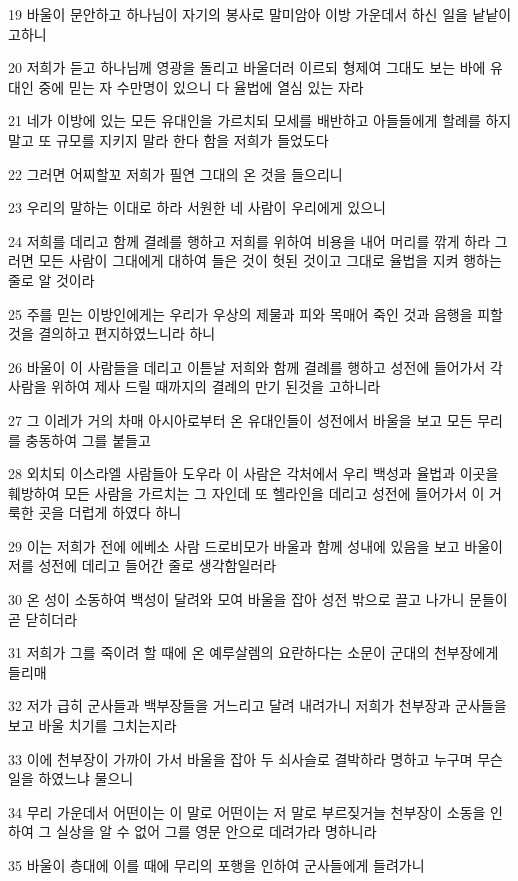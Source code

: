 \par 19 바울이 문안하고 하나님이 자기의 봉사로 말미암아 이방 가운데서 하신 일을 낱낱이 고하니
\par 20 저희가 듣고 하나님께 영광을 돌리고 바울더러 이르되 형제여 그대도 보는 바에 유대인 중에 믿는 자 수만명이 있으니 다 율법에 열심 있는 자라
\par 21 네가 이방에 있는 모든 유대인을 가르치되 모세를 배반하고 아들들에게 할례를 하지 말고 또 규모를 지키지 말라 한다 함을 저희가 들었도다
\par 22 그러면 어찌할꼬 저희가 필연 그대의 온 것을 들으리니
\par 23 우리의 말하는 이대로 하라 서원한 네 사람이 우리에게 있으니
\par 24 저희를 데리고 함께 결례를 행하고 저희를 위하여 비용을 내어 머리를 깎게 하라 그러면 모든 사람이 그대에게 대하여 들은 것이 헛된 것이고 그대로 율법을 지켜 행하는 줄로 알 것이라
\par 25 주를 믿는 이방인에게는 우리가 우상의 제물과 피와 목매어 죽인 것과 음행을 피할 것을 결의하고 편지하였느니라 하니
\par 26 바울이 이 사람들을 데리고 이튿날 저희와 함께 결례를 행하고 성전에 들어가서 각 사람을 위하여 제사 드릴 때까지의 결례의 만기 된것을 고하니라
\par 27 그 이레가 거의 차매 아시아로부터 온 유대인들이 성전에서 바울을 보고 모든 무리를 충동하여 그를 붙들고
\par 28 외치되 이스라엘 사람들아 도우라 이 사람은 각처에서 우리 백성과 율법과 이곳을 훼방하여 모든 사람을 가르치는 그 자인데 또 헬라인을 데리고 성전에 들어가서 이 거룩한 곳을 더럽게 하였다 하니
\par 29 이는 저희가 전에 에베소 사람 드로비모가 바울과 함께 성내에 있음을 보고 바울이 저를 성전에 데리고 들어간 줄로 생각함일러라
\par 30 온 성이 소동하여 백성이 달려와 모여 바울을 잡아 성전 밖으로 끌고 나가니 문들이 곧 닫히더라
\par 31 저희가 그를 죽이려 할 때에 온 예루살렘의 요란하다는 소문이 군대의 천부장에게 들리매
\par 32 저가 급히 군사들과 백부장들을 거느리고 달려 내려가니 저희가 천부장과 군사들을 보고 바울 치기를 그치는지라
\par 33 이에 천부장이 가까이 가서 바울을 잡아 두 쇠사슬로 결박하라 명하고 누구며 무슨 일을 하였느냐 물으니
\par 34 무리 가운데서 어떤이는 이 말로 어떤이는 저 말로 부르짖거늘 천부장이 소동을 인하여 그 실상을 알 수 없어 그를 영문 안으로 데려가라 명하니라
\par 35 바울이 층대에 이를 때에 무리의 포행을 인하여 군사들에게 들려가니
